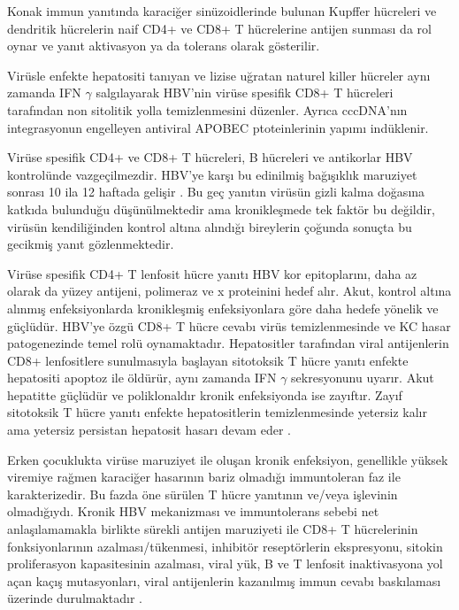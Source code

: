 Konak immun yanıtında karaciğer sinüzoidlerinde bulunan Kupffer hücreleri ve dendritik hücrelerin naif CD4+ ve CD8+ T hücrelerine antijen sunması da rol oynar ve yanıt aktivasyon ya da tolerans olarak gösterilir. 

Virüsle enfekte hepatositi tanıyan ve lizise uğratan naturel killer hücreler aynı zamanda IFN $ \gamma $ salgılayarak HBV'nin virüse spesifik CD8+ T hücreleri tarafından non sitolitik yolla temizlenmesini düzenler. Ayrıca cccDNA'nın integrasyonun engelleyen antiviral APOBEC ptoteinlerinin yapımı indüklenir.

Virüse spesifik CD4+ ve CD8+ T hücreleri, B hücreleri ve antikorlar HBV kontrolünde vazgeçilmezdir. HBV'ye karşı bu edinilmiş bağışıklık maruziyet sonrası 10 ila 12 haftada gelişir \cite{bertoletti2016adaptive,webster2000incubation}. Bu geç yanıtın virüsün gizli kalma doğasına katkıda bulunduğu düşünülmektedir ama kronikleşmede tek faktör bu değildir, virüsün kendiliğinden kontrol altına alındığı bireylerin çoğunda sonuçta bu gecikmiş yanıt gözlenmektedir.

Virüse spesifik CD4+ T lenfosit hücre yanıtı HBV kor epitoplarını, daha az olarak da yüzey antijeni, polimeraz ve x proteinini hedef alır. Akut, kontrol altına alınmış enfeksiyonlarda kronikleşmiş enfeksiyonlara göre daha hedefe yönelik ve güçlüdür. HBV'ye özgü CD8+ T hücre cevabı virüs temizlenmesinde ve KC hasar patogenezinde temel rolü oynamaktadır. Hepatositler tarafından viral antijenlerin CD8+ lenfositlere sunulmasıyla başlayan sitotoksik T hücre yanıtı enfekte hepatositi apoptoz ile öldürür, aynı zamanda IFN $ \gamma $ sekresyonunu uyarır. Akut hepatitte güçlüdür ve poliklonaldır kronik enfeksiyonda ise zayıftır. Zayıf sitotoksik T hücre yanıtı enfekte hepatositlerin temizlenmesinde yetersiz kalır ama yetersiz persistan hepatosit hasarı devam eder \cite{chisari2010pathogenesis}.


Erken çocuklukta virüse maruziyet ile oluşan kronik enfeksiyon, genellikle yüksek viremiye rağmen karaciğer hasarının bariz olmadığı immuntoleran faz ile karakterizedir. Bu fazda öne sürülen T hücre yanıtının ve/veya işlevinin olmadığıydı. Kronik HBV mekanizması ve immuntolerans sebebi net anlaşılamamakla birlikte sürekli antijen maruziyeti ile CD8+ T hücrelerinin fonksiyonlarının azalması/tükenmesi, inhibitör reseptörlerin ekspresyonu, sitokin proliferasyon kapasitesinin azalması,  viral yük, B ve T lenfosit inaktivasyona yol açan kaçış mutasyonları, viral antijenlerin kazanılmış immun cevabı baskılaması üzerinde durulmaktadır \cite{raziorrouh2010immunoregulatory,schurich2011role,chen2004function,webster2004longitudinal,reignat2002escaping}.



